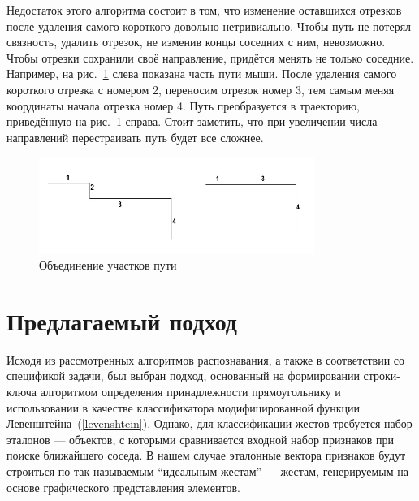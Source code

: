 \documentclass[a5paper]{article}
\begin{document}
Недостаток этого алгоритма состоит в том, что изменение оставшихся отрезков после удаления самого короткого довольно нетривиально. Чтобы путь не потерял связность, удалить отрезок, не изменив концы соседних с ним, невозможно. Чтобы отрезки сохранили своё направление, придётся менять не только соседние. Например, на рис.~\ref{qt} слева показана часть пути мыши. После удаления самого короткого отрезка с номером 2, переносим отрезок номер 3, тем самым меняя координаты начала отрезка номер 4. Путь преобразуется в траекторию, приведённую на рис.~\ref{qt} справа. Стоит заметить, что при увеличении числа направлений перестраивать путь будет все сложнее. 

\begin{figure} [ht]
  \begin{center}
    \includegraphics[width=0.8\textwidth, bb=0 0 500 200]{04-qt.png}
    \caption{Объединение участков пути}
    \label{qt}
  \end{center}
\end{figure}

\section{Предлагаемый подход}
\label{rectAlgorithm}
Исходя из рассмотренных алгоритмов распознавания, а также в соответствии со спецификой задачи, был выбран подход, основанный на формировании строки-ключа алгоритмом определения принадлежности прямоугольнику и использовании в качестве классификатора модифицированной функции Левенштейна~(\ref{levenshtein}). Однако, для классификации жестов требуется набор эталонов --- объектов, с которыми сравнивается входной набор признаков при поиске ближайшего соседа. В нашем случае эталонные вектора признаков будут строиться по так называемым ``идеальным жестам'' --- жестам, генерируемым на основе графического представления элементов. 
\end{document}
